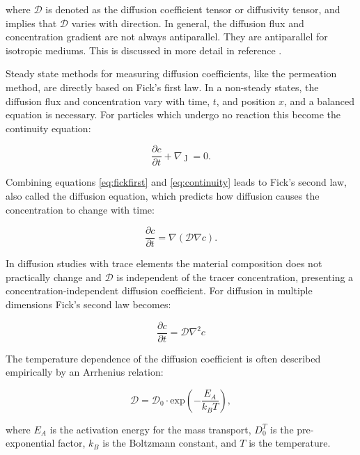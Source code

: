 \documentclass[../main.tex]{subfiles}
\begin{document}
where $\mathcal{D}$ is denoted as the diffusion coefficient tensor or diffusivity tensor, and implies that $\mathcal{D}$ varies with direction. In general, the diffusion flux and concentration gradient are not always antiparallel. They are antiparallel for isotropic mediums. This is discussed in more detail in reference .

Steady state methods for measuring diffusion coefficients, like the permeation method, \cite{heumann2013diffusion} are directly based on Fick's first law. In a non-steady states, the diffusion flux and concentration vary with time, $t$, and position $x$, and a balanced equation is necessary. For particles which undergo no reaction this become the continuity equation:

\begin{equation}
    \frac{\partial c}{\partial t} + \nabla {\boldsymbol{\jmath}} = 0.
    \label{eq:continuity}
\end{equation}

Combining equations \ref{eq:fickfirst} and \ref{eq:continuity} leads to Fick's second law, also called the diffusion equation, which predicts how diffusion causes the concentration to change with time:

\begin{equation}
    \label{eq:ficksecond}
    \frac{\partial c}{\partial t} = \nabla (\mathcal{D} \nabla c ).
\end{equation}

In diffusion studies with trace elements the material composition does not practically change and $\mathcal{D}$ is independent of the tracer concentration, presenting a concentration-independent diffusion coefficient. For diffusion in multiple dimensions Fick's second law becomes: \cite{crank1979mathematics}

\begin{equation}
    \frac{\partial c}{\partial t} = \mathcal{D} \nabla^2 c
    \label{eq:nodirectional_diffusion}
\end{equation}

The temperature dependence of the diffusion coefficient is often described empirically by an Arrhenius relation:

\begin{equation}
    \mathcal{D} = \mathcal{D}_0 \cdot \textrm{exp} \left (- \frac{E_A}{k_B T} \right ),
\end{equation}

where $E_A$ is the activation energy for the mass transport, $D_0^T$ is the pre-exponential factor, $k_B$ is the Boltzmann constant, and $T$ is the temperature.
\end{document}
